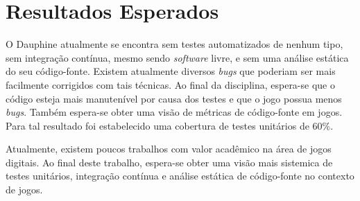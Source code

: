 \chapter[Resultados Esperados]{Resultados Esperados}

O Dauphine atualmente se encontra sem testes automatizados de nenhum tipo, sem integração contínua, mesmo sendo \textit{software} livre, e sem uma análise estática do seu código-fonte. Existem atualmente diversos \textit{bugs} que poderiam ser mais facilmente corrigidos com tais técnicas. Ao final da disciplina, espera-se que o código esteja mais manutenível por causa dos testes e que o jogo possua menos \textit{bugs}. Também espera-se obter uma visão de métricas de código-fonte em jogos. Para tal resultado foi estabelecido uma cobertura de testes unitários de 60\%.

Atualmente, existem poucos trabalhos com valor acadêmico na área de jogos digitais. Ao final deste trabalho, espera-se obter uma visão mais sistemica de testes unitários, integração contínua e análise estática de código-fonte no contexto de jogos.
